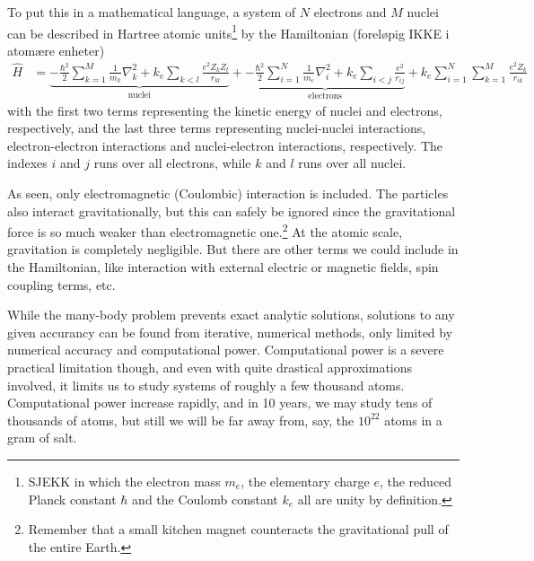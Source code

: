 \documentclass[11pt,bibliography=totoc,index=totoc]{scrbook}   %
\begin{document}
To put this in a mathematical language, a system of $N$ electrons and $M$ nuclei can be described in Hartree atomic units\footnote{SJEKK
in which the electron mass $m_e$, the elementary
charge $e$, the reduced Planck constant $\hbar$ and the Coulomb constant
$k_e$ all are unity by definition.
} by the Hamiltonian (foreløpig IKKE i atomære enheter)
\begin{align}
  \hat{H} &= 
	 \underbrace{
		- \frac{\hbar^2}{2}\sum_{k=1}^M \frac{1}{m_k}\nabla_k^2 
        + k_e \sum_{k<l}\frac{e^2Z_kZ_l}{r_{kl}}
		}_{\text{nuclei}}
  +
  \underbrace{
	-\frac{\hbar^2}{2}\sum_{i=1}^N\frac{1}{m_e}\nabla_i^2
	+ k_e  \sum_{i<j}\frac{e^2}{r_{ij}}
	}_{\text{electrons}}
		+ k_e \sum_{i=1}^N\sum_{k=1}^M \frac{e^2Z_k}{r_{ik}}
  \label{eq:mol-hamiltonian}
\end{align}
with the first two terms representing the kinetic energy of nuclei and electrons, respectively, 
and the last three terms representing nuclei-nuclei interactions, electron-electron interactions
and nuclei-electron interactions, respectively.
The indexes $i$ and $j$ runs over all electrons, while $k$ and $l$ runs over all nuclei. 

As seen, only electromagnetic (Coulombic) interaction is included. 
The particles also interact gravitationally, but this can safely be ignored since the gravitational force is so much weaker than electromagnetic one.\footnote{Remember that a small kitchen magnet counteracts the gravitational pull of the entire Earth.}
At the atomic scale, gravitation is completely negligible. But there are
other terms we could include in the Hamiltonian, like interaction with external electric or magnetic fields, spin coupling terms, etc.

While the many-body problem prevents exact analytic solutions, solutions to any given accurancy can be found from iterative, numerical methods, only limited by numerical accuracy and computational power. Computational power is a severe practical limitation though, and even with quite drastical approximations involved, it limits us to study systems of roughly a few thousand atoms. Computational power increase rapidly, and in 10 years, we may study tens of thousands of atoms, but still we will be far away from, say, the $10^{22}$ atoms in a gram of salt.

\end{document}
